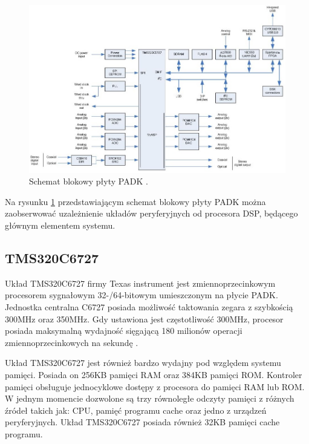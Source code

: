 \begin{figure}[H]
	\centering
	\includegraphics[width=16cm]{./grafiki/real_PADK_block}
	\captionsetup{justification=centering}
	\caption{Schemat blokowy płyty PADK \cite{dokumentacja_PADK}.}
	\label{rys:real_padk}
\end{figure}

Na rysunku \ref{rys:real_padk} przedstawiającym schemat blokowy płyty PADK można zaobserwować uzależnienie układów peryferyjnych od procesora DSP, będącego głównym elementem systemu.

\subsection{TMS320C6727}
Układ TMS320C6727 firmy Texas instrument jest zmiennoprzecinkowym procesorem sygnałowym 32-/64-bitowym umieszczonym na płycie PADK. Jednostka centralna C6727 posiada możliwość taktowania zegara z szybkością 300MHz oraz 350MHz. Gdy ustawiona jest częstotliwość 300MHz, procesor posiada maksymalną wydajność sięgającą 180 milionów operacji zmiennoprzecinkowych na sekundę \cite{dokumentacja_ti6727}.

Układ TMS320C6727 jest również bardzo wydajny pod względem systemu pamięci. Posiada on 256KB pamięci RAM oraz 384KB pamięci ROM. Kontroler pamięci obsługuje jednocyklowe dostępy z procesora do pamięci  RAM lub ROM. W jednym momencie dozwolone są trzy równoległe odczyty pamięci z różnych źródeł takich jak: CPU, pamięć programu cache oraz jedno z urządzeń peryferyjnych. Układ TMS320C6727 posiada również 32KB pamięci cache programu.

